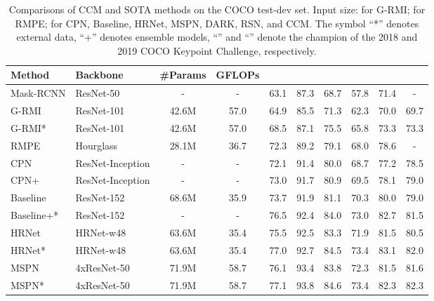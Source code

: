 \documentclass[twocolumn]{svjour3}          \smartqed  \usepackage{natbib}
\begin{document}
\begin{table*}[htbp]
\centering
  \caption{Comparisons of CCM and SOTA methods on the COCO test-dev set. Input size:  for G-RMI;  for RMPE;  for CPN, Baseline, HRNet, MSPN, DARK, RSN, and CCM. The symbol ``*'' denotes external data, ``+'' denotes ensemble models, ``'' and ``'' denote the champion of the 2018 and 2019 COCO Keypoint Challenge, respectively.}
    \begin{tabular}{llcccccccc}
\toprule
      Method  & Backbone & \#Params & GFLOPs &     &   &   &    &    &  \\
    \midrule
    Mask-RCNN \citep{he2017mask} & ResNet-50 &  - & - & 63.1    &  87.3     &  68.7     &  57.8    &  71.4     & - \\
    G-RMI \citep{papandreou2017towards} & ResNet-101   &42.6M & 57.0  &64.9   & 85.5      &  71.3     &   62.3    &   70.0    &   69.7 \\
    G-RMI* \citep{papandreou2017towards} & ResNet-101  &42.6M & 57.0   &68.5    &87.1      &75.5       &  65.8     &   73.3     & 73.3 \\
    RMPE \citep{fang2017rmpe} & Hourglass & 28.1M & 36.7 &72.3      &89.2     &79.1       &68.0       &78.6         &- \\
    CPN \citep{chen2018cascaded} & ResNet-Inception & - & -   &72.1      &91.4      &80.0     &68.7        &77.2         &78.5 \\
    CPN+ \citep{chen2018cascaded} & ResNet-Inception & - & -   &73.0     & 91.7    &80.9       &69.5       &78.1         &79.0 \\
    Baseline \citep{xiao2018simple} & ResNet-152 & 68.6M & 35.9 & 73.7     &  91.9     &  81.1     &  70.3     &  80.0     & 79.0 \\
    Baseline+* \citep{xiao2018simple} & ResNet-152 & - & - & 76.5     &  92.4     &  84.0     &  73.0     & 82.7     & 81.5 \\
    HRNet \citep{sun2019deep} & HRNet-w48 & 63.6M & 35.4 & 75.5     &  92.5     &  83.3     &  71.9     &  81.5    & 80.5 \\
    HRNet* \citep{sun2019deep} & HRNet-w48 &  63.6M & 35.4 & 77.0   &  92.7     &  84.5     &  73.4     &  83.1    & 82.0 \\
    MSPN \citep{li2019rethinking} & 4xResNet-50 & 71.9M & 58.7 &76.1  &93.4      &83.8       &72.3       &81.5       &81.6 \\
    MSPN* \citep{li2019rethinking} & 4xResNet-50 & 71.9M & 58.7 &77.1  &93.8      &84.6       &73.4       &82.3       &82.3 \\

\end{tabular}
\end{table*}
\end{document}
